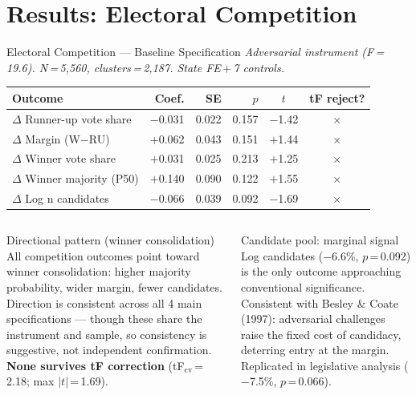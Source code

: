 \documentclass[aspectratio=169,10pt]{beamer}
\newcommand{\cross}{{\color{myred}$\times$}}
\begin{document}
\section{Results: Electoral Competition}

\begin{frame}{Electoral Competition --- Baseline Specification}
\footnotesize
\textit{Adversarial instrument (F\,=\,19.6). N\,=\,5,560, clusters\,=\,2,187. State FE\,$+$\,7 controls.}
\smallskip
\renewcommand{\arraystretch}{1.2}
\begin{tabular}{L{4.2cm}rrrcc}
  \toprule
  Outcome & Coef. & SE & $p$ & $t$ & tF reject? \\
  \midrule
  $\Delta$ Runner-up vote share  & $-$0.031 & 0.022 & 0.157 & $-$1.42 & \cross \\
  $\Delta$ Margin (W$-$RU)       & $+$0.062 & 0.043 & 0.151 & $+$1.44 & \cross \\
  $\Delta$ Winner vote share     & $+$0.031 & 0.025 & 0.213 & $+$1.25 & \cross \\
  $\Delta$ Winner majority (P50) & $+$0.140 & 0.090 & 0.122 & $+$1.55 & \cross \\
  $\Delta$ Log n candidates      & $-$0.066 & 0.039 & 0.092 & $-$1.69 & \cross \\
  \bottomrule
\end{tabular}
\normalsize
\medskip
\begin{columns}[T]
\begin{column}{0.50\textwidth}
\begin{block}{Directional pattern (winner consolidation)}
  \footnotesize
  All competition outcomes point toward winner consolidation: higher majority probability, wider margin, fewer candidates. Direction is consistent across all 4 main specifications --- though these share the instrument and sample, so consistency is suggestive, not independent confirmation. \textbf{None survives tF correction} (tF$_\text{cv}$\,=\,2.18; max $|t|$\,=\,1.69).
\end{block}
\end{column}
\begin{column}{0.47\textwidth}
\begin{alertblock}{Candidate pool: marginal signal}
  \footnotesize
  Log candidates ($-$6.6\%, $p$\,=\,0.092) is the only outcome approaching conventional significance. Consistent with Besley \& Coate (1997): adversarial challenges raise the fixed cost of candidacy, deterring entry at the margin. Replicated in legislative analysis ($-$7.5\%, $p$\,=\,0.066).
\end{alertblock}
\end{column}
\end{columns}
\end{frame}
\end{document}
